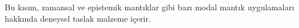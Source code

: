 \documentclass[../../include/open-logic-part]{subfiles}
\begin{document}

\begin{editorial}
Bu kısım, zamansal ve epistemik mantıklar gibi bazı modal mantık uygulamaları
hakkında deneysel taslak malzeme içerir.
\end{editorial}



\OLEndPartHook
\end{document}
